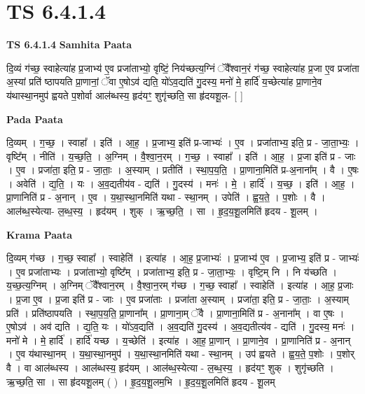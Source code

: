 \documentclass[17pt]{extarticle}
\begin{document}
\section{ TS 6.4.1.4 }

\textbf{TS 6.4.1.4 } \newline
\textbf{Samhita Paata} \newline

दि॒व्यं ग॑च्छ॒ स्वाहेत्या॑ह प्र॒जाभ्य॑ ए॒व प्रजा॑ताभ्यो॒ वृष्टिं॒ निय॑च्छत्य॒ग्निं ॅवै᳚श्वान॒रं ग॑च्छ॒ स्वाहेत्या॑ह प्र॒जा ए॒व प्रजा॑ता अ॒स्यां प्रति॑ ष्ठापयति प्रा॒णानां॒ ॅवा ए॒षोऽव॑ द्यति॒ यो॑ऽव॒द्यति॑ गु॒दस्य॒ मनो॑ मे॒ हार्दि॑ य॒च्छेत्या॑ह प्रा॒णाने॒व य॑थास्था॒नमुप॑ ह्वयते प॒शोर्वा आल॑ब्धस्य॒ हृद॑यꣳ॒॒ शुगृ॑च्छति॒ सा हृ॑दयशू॒ल- [  ] \newline

\textbf{Pada Paata} \newline

दि॒व्यम् । ग॒च्छ॒ । स्वाहा᳚ । इति॑ । आ॒ह॒ । प्र॒जाभ्य॒ इति॑ प्र-जाभ्यः॑ । ए॒व । प्रजा॑ताभ्य॒ इति॒ प्र - जा॒ता॒भ्यः॒ । वृष्टि᳚म् । नीति॑ । य॒च्छ॒ति॒ । अ॒ग्निम् । वै॒श्वा॒न॒रम् । ग॒च्छ॒ । स्वाहा᳚ । इति॑ । आ॒ह॒ । प्र॒जा इति॑ प्र - जाः । ए॒व । प्रजा॑ता॒ इति॒ प्र - जा॒ताः॒ । अ॒स्याम् । प्रतीति॑ । स्था॒प॒य॒ति॒ । प्रा॒णाना॒मिति॑ प्र-अ॒नाना᳚म् । वै । ए॒षः । अवेति॑ । द्य॒ति॒ । यः । अ॒व॒द्यतीय॑व - द्यति॑ । गु॒दस्य॑ । मनः॑ । मे॒ । हार्दि॑ । य॒च्छ॒ । इति॑ । आ॒ह॒ । प्रा॒णानिति॑ प्र - अ॒नान् । ए॒व । य॒था॒स्था॒नमिति॑ यथा - स्था॒नम् । उपेति॑ । ह्व॒य॒ते॒ । प॒शोः । वै । आल॑ब्ध॒स्येत्या- ल॒ब्ध॒स्य॒ । हृद॑यम् । शुक् । ऋ॒च्छ॒ति॒ । सा । हृ॒द॒य॒शू॒लमिति॑ हृदय - शू॒लम् ।  \newline


\textbf{Krama Paata} \newline

दि॒व्यम् ग॑च्छ । ग॒च्छ॒ स्वाहा᳚ । स्वाहेति॑ । इत्या॑ह । आ॒ह॒ प्र॒जाभ्यः॑ । प्र॒जाभ्य॑ ए॒व । प्र॒जाभ्य॒ इति॑ प्र - जाभ्यः॑ । ए॒व प्रजा॑ताभ्यः । प्रजा॑ताभ्यो॒ वृष्टि᳚म् । प्रजा॑ताभ्य॒ इति॒ प्र - जा॒ता॒भ्यः॒ । वृष्टि॒म् नि । नि य॑च्छति । य॒च्छ॒त्य॒ग्निम् । अ॒ग्निम् ॅवै᳚श्वान॒रम् । वै॒श्वा॒न॒रम् ग॑च्छ । ग॒च्छ॒ स्वाहा᳚ । स्वाहेति॑ । इत्या॑ह । आ॒ह॒ प्र॒जाः । प्र॒जा ए॒व । प्र॒जा इति॑ प्र - जाः । ए॒व प्रजा॑ताः । प्रजा॑ता अ॒स्याम् । प्रजा॑ता॒ इति॒ प्र - जा॒ताः॒ । अ॒स्याम् प्रति॑ । प्रति॑ष्ठापयति । स्था॒प॒य॒ति॒ प्रा॒णाना᳚म् । प्रा॒णाना॒म् ॅवै । प्रा॒णाना॒मिति॑ प्र - अ॒नाना᳚म् । वा ए॒षः । ए॒षोऽव॑ । अव॑ द्यति । द्य॒ति॒ यः । यो॑ऽव॒द्यति॑ । अ॒व॒द्यति॑ गु॒दस्य॑ । अ॒व॒द्यतीत्य॑व - द्यति॑ । गु॒दस्य॒ मनः॑ । मनो॑ मे । मे॒ हार्दि॑ । हार्दि॑ यच्छ । य॒च्छेति॑ । इत्या॑ह । आ॒ह॒ प्रा॒णान् । प्रा॒णाने॒व । प्रा॒णानिति॑ प्र - अ॒नान् । ए॒व य॑थास्था॒नम् । य॒था॒स्था॒नमुप॑ । य॒था॒स्था॒नमिति॑ यथा - स्था॒नम् । उप॑ ह्वयते । ह्व॒य॒ते॒ प॒शोः । प॒शोर् वै । वा आल॑ब्धस्य । आल॑ब्धस्य॒ हृद॑यम् । आल॑ब्ध॒स्येत्या - ल॒ब्ध॒स्य॒ । हृद॑यꣳ॒॒ शुक् । शुगृ॑च्छति । ऋ॒च्छ॒ति॒ सा । सा हृ॑दयशू॒लम् ( ) । हृ॒द॒य॒शू॒लम॒भि । हृ॒द॒य॒शू॒लमिति॑ हृदय - शू॒लम् \newline
\end{document}
